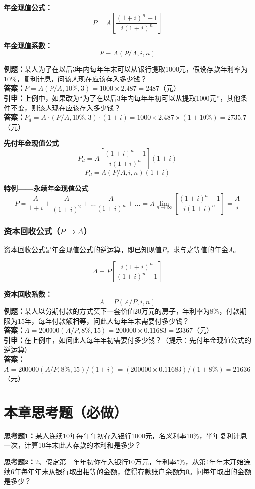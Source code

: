 \noindent \textbf{年金现值公式：}
$$P=A[\frac{(1+i)^n-1}{i(1+i)^n}]$$

\noindent \textbf{年金现值系数：}
$$P=A(P/A,i,n)$$

\noindent \textbf{例题：}某人为了在以后3年内每年年末可以从银行提取1000元，假设存款年利率为10\%，复利计息，问该人现在应该存入多少钱？\\
\textbf{答案：}$P=A(P/A,10\%,3)=1000 \times 2.487=2487$（元）\\
\textbf{引申：}上例中，如果改为“为了在以后3年内每年年初可以从提取1000元”，其他条件不变，则该人现在应该存入多少钱？\\
\textbf{答案：}$P_d=A \cdot (P/A,10\%,3) \cdot (1+i) =1000 \times 2.487 \times (1+10\%)=2735.7$（元）

\noindent \textbf{先付年金现值公式}
$$P_d=A[\frac{(1+i)^n-1}{i(1+i)^n}](1+i)$$
$$P_d=A(P/A,i,n)(1+i)$$

\noindent \textbf{特例——永续年金现值公式}
$$P=\frac{A}{1+i}+\frac{A}{(1+i)^2}+...\frac{A}{(1+i)^n}+...=A\lim_{n \to \infty}[\frac{(1+i)^n-1}{i(1+i)^n}]=\frac{A}{i}$$

\subsubsection{资本回收公式（$P \to A$）}
资本回收公式是年金现值公式的逆运算，即已知现值$P$，求与之等值的年金$A$。

$$A=P[\frac{i(1+i)^n}{(1+i)^n-1}]$$

\noindent \textbf{资本回收系数：}
$$A=P(A/P,i,n)$$
\textbf{例题：}某人以分期付款的方式买下一套价值20万元的房子，年利率为8\%，付款期限为15年，每年付款额相等，问此人每年年末需要付多少钱？\\
\textbf{答案：}$A=200000(A/P,8\%,15)=200000 \times 0.11683=23367$（元）\\
\textbf{引申：}在上例中，如问此人每年年初需要付多少钱？（提示：先付年金现值公式的逆运算）\\
\textbf{答案：}$A=200000(A/P,8\%,15)/(1+i)=(200000 \times 0.11683)/(1+8\%)=21636$（元）

\section{本章思考题（必做）}
\noindent \textbf{思考题1：}某人连续10年每年年初存入银行1000元，名义利率10\%，半年复利计息一次，计算10年末此人存款的本利和是多少？

\noindent \textbf{思考题2：}2、假定第一年年初你存入银行10万元，年利率5\%，从第4年年末开始连续6年每年年末从银行取出相等的金额，使得存款账户余额为0。问每年取出的金额是多少？

